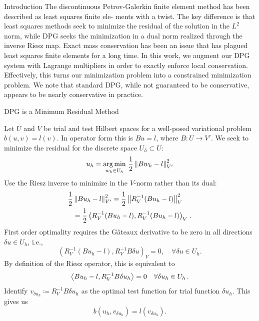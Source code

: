 \documentclass[final]{beamer}
\newlength{\onecolwid}
\begin{document}
\begin{frame}[t]
\begin{columns}[t]
\begin{column}{\onecolwid}
\begin{block}{Introduction}
The discontinuous Petrov-Galerkin finite element method has been described as least squares finite ele-
ments with a twist. The key difference is that least squares methods seek to minimize the residual of the
solution in the $L^2$ norm, while DPG seeks the minimization in a dual norm realized through the inverse Riesz
map. Exact mass conservation has been an issue that has plagued least squares finite elements for a long
time. In this work, we augment our DPG system with Lagrange multipliers in
order to exactly enforce local conservation. Effectively, this turns our
minimization problem into a constrained minimization problem. We note that
standard DPG, while not guaranteed to be conservative, appears to be nearly
conservative in practice.

\end{block}


\begin{block}{DPG is a Minimum Residual Method}

Let $U$ and $V$ be trial and test Hilbert spaces for a well-posed variational
problem $b(u,v)=l(v)$. In operator form this is $Bu=l$, where $B:U\rightarrow
V'$. We seek to minimize the residual for the discrete space $U_h\subset U$:
\[
u_{h} = \underset{w_{h} \in U_{h}} {\operatorname*{arg\,min}} \,\, \frac{1}{2}
\left\| Bw_{h}-l \right\|_{V'}^{2}
\]
Use the Riesz inverse to minimize in the $V$-norm rather than its dual:
\begin{align*}
\frac{1}{2}&\left\| Bu_h-l \right\|^2_{V'}=\frac{1}{2}\left\| R_V^{-1}(Bu_h-l) \right\|^2_V\\
&=\frac{1}{2}\left( R_V^{-1}(Bu_h-l),R_V^{-1}(Bu_h-l) \right)_V\,.
\end{align*}
First order optimality requires
the G\^ateaux derivative to be zero in all directions $\delta u \in
U_h$, i.e.,
\[
\left(R_V^{-1}(Bu_h-l),R_V^{-1}B\delta u\right)_V = 0, \quad \forall \delta u \in U_h.
\]
By definition of the Riesz operator, this is equivalent to
\begin{equation*}
\left\langle Bu_h-l,R_V^{-1}B\delta u_h \right\rangle=0\quad\forall\delta u_h\in U_h\,.
\end{equation*}
Identify $v_{\delta u_h}\coloneqq R_V^{-1}B\delta u_h$ as the
optimal test function for trial function $\delta u_h$. This gives us
\begin{equation*}
b(u_h,v_{\delta u_h})=l(v_{\delta u_h}).
\end{equation*}


\end{block}
\end{column}
\end{columns}
\end{frame}
\end{document}
